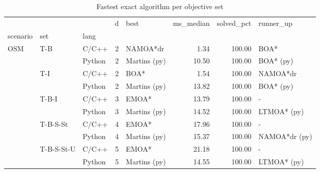 \begin{table}
\caption{Fastest exact algorithm per objective set}
\label{tab:T3_best_algorithm_OSM}
\begin{tabular}{lllrlrrl}
\toprule
 &  &  & d & best & ms_median & solved_pct & runner_up \\
scenario & set & lang &  &  &  &  &  \\
\midrule
\multirow[t]{10}{*}{OSM} & \multirow[t]{2}{*}{T-B} & C/C++ & 2 & NAMOA*dr & 1.34 & 100.00 & BOA* \\
 &  & Python & 2 & Martins (py) & 10.50 & 100.00 & BOA* (py) \\
\cline{2-8}
 & \multirow[t]{2}{*}{T-I} & C/C++ & 2 & BOA* & 1.54 & 100.00 & NAMOA*dr \\
 &  & Python & 2 & Martins (py) & 13.82 & 100.00 & BOA* (py) \\
\cline{2-8}
 & \multirow[t]{2}{*}{T-B-I} & C/C++ & 3 & EMOA* & 13.79 & 100.00 & - \\
 &  & Python & 3 & Martins (py) & 14.52 & 100.00 & LTMOA* (py) \\
\cline{2-8}
 & \multirow[t]{2}{*}{T-B-S-St} & C/C++ & 4 & EMOA* & 17.96 & 100.00 & - \\
 &  & Python & 4 & Martins (py) & 15.37 & 100.00 & NAMOA*dr (py) \\
\cline{2-8}
 & \multirow[t]{2}{*}{T-B-S-St-U} & C/C++ & 5 & EMOA* & 21.18 & 100.00 & - \\
 &  & Python & 5 & Martins (py) & 14.55 & 100.00 & LTMOA* (py) \\
\cline{1-8} \cline{2-8}
\bottomrule
\end{tabular}
\end{table}
